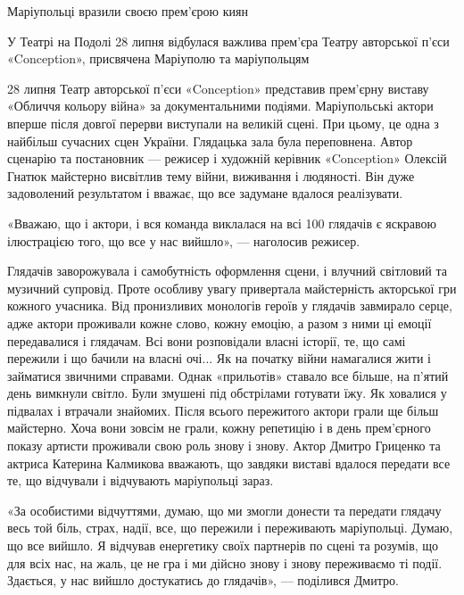  
 
 
 
 

Маріупольці вразили своєю прем'єрою киян

У Театрі на Подолі 28 липня відбулася важлива прем'єра Театру авторської п'єси «Conception», присвячена Маріуполю та маріупольцям

28 липня Театр авторської п'єси «Conception» представив прем'єрну виставу
«Обличчя кольору війна» за документальними подіями. Маріупольські актори вперше
після довгої перерви виступали на великій сцені. При цьому, це одна з найбільш
сучасних сцен України. Глядацька зала була переповнена. Автор сценарію та
постановник — режисер і художній керівник «Conception» Олексій Гнатюк майстерно
висвітлив тему війни, виживання і людяності. Він дуже задоволений результатом і
вважає, що все задумане вдалося реалізувати.

«Вважаю, що і актори, і вся команда виклалася на всі 100%
глядачів є яскравою ілюстрацією того, що все у нас вийшло», — наголосив
режисер. 

Глядачів заворожувала і самобутність оформлення сцени, і влучний світловий та
музичний супровід. Проте особливу увагу привертала майстерність акторської гри
кожного учасника. Від пронизливих монологів героїв у глядачів завмирало серце,
адже актори проживали кожне слово, кожну емоцію, а разом з ними ці емоції
передавалися і глядачам. Всі вони розповідали власні історії, те, що самі
пережили і що бачили на власні очі... Як на початку війни намагалися жити і
займатися звичними справами. Однак «прильотів» ставало все більше, на п'ятий
день вимкнули світло. Були змушені під обстрілами готувати їжу. Як ховалися у
підвалах і втрачали знайомих. Після всього пережитого актори грали ще більш
майстерно. Хоча вони зовсім не грали, кожну репетицію і в день прем'єрного
показу артисти проживали свою роль знову і знову. Актор Дмитро Гриценко та
актриса Катерина Калмикова вважають, що завдяки виставі вдалося передати все
те, що відчували і відчувають маріупольці зараз.

«За особистими відчуттями, думаю, що ми змогли донести та передати глядачу весь
той біль, страх, надії, все, що пережили і переживають маріупольці. Думаю, що
все вийшло. Я відчував енергетику своїх партнерів по сцені та розумів, що для
всіх нас, на жаль, це не гра і ми дійсно знову і знову переживаємо ті події.
Здається, у нас вийшло достукатись до глядачів», — поділився Дмитро.

